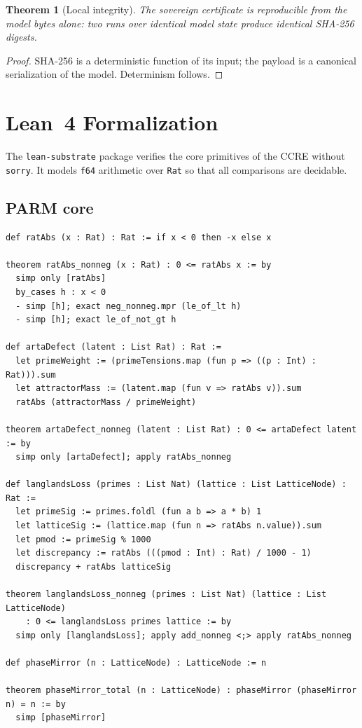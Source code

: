 \documentclass[11pt]{article}
\newtheorem{theorem}{Theorem}[section]
\theoremstyle{definition}
\begin{document}
\begin{theorem}[Local integrity]
\label{thm:local}
  The sovereign certificate is reproducible from the model bytes alone: two
  runs over identical model state produce identical SHA-256 digests.
\end{theorem}

\begin{proof}
  SHA-256 is a deterministic function of its input; the payload is a canonical
  serialization of the model. Determinism follows.
\end{proof}

\section{Lean~4 Formalization}
\label{sec:lean}

The \texttt{lean-substrate} package verifies the core primitives of the CCRE
without \texttt{sorry}. It models \texttt{f64} arithmetic over \texttt{Rat} so
that all comparisons are decidable.

\subsection{PARM core}

\begin{lstlisting}
def ratAbs (x : Rat) : Rat := if x < 0 then -x else x

theorem ratAbs_nonneg (x : Rat) : 0 <= ratAbs x := by
  simp only [ratAbs]
  by_cases h : x < 0
  - simp [h]; exact neg_nonneg.mpr (le_of_lt h)
  - simp [h]; exact le_of_not_gt h

def artaDefect (latent : List Rat) : Rat :=
  let primeWeight := (primeTensions.map (fun p => ((p : Int) : Rat))).sum
  let attractorMass := (latent.map (fun v => ratAbs v)).sum
  ratAbs (attractorMass / primeWeight)

theorem artaDefect_nonneg (latent : List Rat) : 0 <= artaDefect latent := by
  simp only [artaDefect]; apply ratAbs_nonneg

def langlandsLoss (primes : List Nat) (lattice : List LatticeNode) : Rat :=
  let primeSig := primes.foldl (fun a b => a * b) 1
  let latticeSig := (lattice.map (fun n => ratAbs n.value)).sum
  let pmod := primeSig % 1000
  let discrepancy := ratAbs (((pmod : Int) : Rat) / 1000 - 1)
  discrepancy + ratAbs latticeSig

theorem langlandsLoss_nonneg (primes : List Nat) (lattice : List LatticeNode)
    : 0 <= langlandsLoss primes lattice := by
  simp only [langlandsLoss]; apply add_nonneg <;> apply ratAbs_nonneg

def phaseMirror (n : LatticeNode) : LatticeNode := n

theorem phaseMirror_total (n : LatticeNode) : phaseMirror (phaseMirror n) = n := by
  simp [phaseMirror]
\end{lstlisting}
\end{document}
